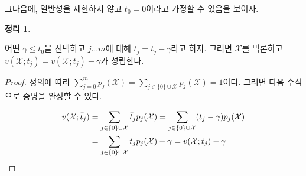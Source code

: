 \documentclass[11pt]{article} %
\newif\ifen
\newtheorem{theorem}{Theorem}
\newtheorem{proposition}{Proposition}
\theoremstyle{definition}
\newtheorem{theorem}{정리}
\newtheorem{proposition}{제의}
\theoremstyle{definition}
\begin{document}
\ifen
Next, we show that without loss of generality, we may assume that $t_0 = 0$.
\else
그다음에, 일반성을 제한하지 않고 $t_0 = 0$이라고 가정할 수 있음을 보이자.
\fi
\begin{theorem} \label{assumetzerozero}
\ifen 
For some $\gamma \leq t_0$, let $\bar t_j = t_j - \gamma$ for $j = 0 \dots m$. Then $v(\mathcal{X}; \bar t_j) = v(\mathcal{X};  t_j) -  \gamma$ regardless of $\mathcal{X}$. 
\else
어떤 $\gamma \leq t_0$을 선택하고 $j \dots m$에 대해 $\bar t_j = t_j - \gamma$라고 하자. 그러면 $\mathcal{X}$를 막론하고 $v(\mathcal{X}; \bar t_j) = v(\mathcal{X};  t_j) -  \gamma$가 성립한다.
\fi
\end{theorem}
\begin{proof}
\ifen
By definition, $\sum_{j=0}^m p_j(\mathcal{X}) = \sum_{j \in \{0\}\cup\mathcal{X}} p_j(\mathcal{X}) = 1$. Therefore
\else
정의에 따라 $\sum_{j=0}^m p_j(\mathcal{X}) = \sum_{j \in \{0\}\cup\mathcal{X}} p_j(\mathcal{X}) = 1$이다. 그러면 다음 수식으로 증명을 완성할 수 있다.
\fi
\begin{align}
\begin{split}
v(\mathcal{X}; \bar t_j) &= \sum_{j\in \{0\}\cup\mathcal{X}}  \bar t_j p_j(\mathcal{X})
=\sum_{j\in \{0\}\cup\mathcal{X}} (t_j - \gamma) p_j(\mathcal{X}) \\
&=\sum_{j\in \{0\}\cup\mathcal{X}} t_j p_j(\mathcal{X})  - \gamma 
= v(\mathcal{X}; t_j) - \gamma
\end{split} \ifen\else\qedhere\fi
\end{align}
\ifen which completes the proof.\fi
\end{proof}



%
\end{document}
